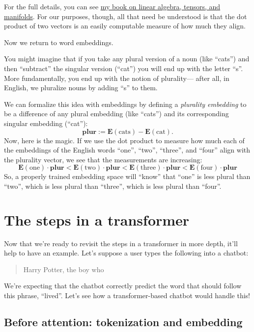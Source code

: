 \documentclass{article}
\begin{document}
For the full details, you can see \href{https://github.com/rossgk2/Linear-algebra-tensors-manifolds}{my book on linear algebra, tensors, and manifolds}. For our purposes, though, all that need be understood is that the dot product of two vectors is an easily computable measure of how much they align.

Now we return to word embeddings.

You might imagine that if you take any plural version of a noun (like ``cats'') and then ``subtract'' the singular version (``cat'') you will end up with the letter ``s''. More fundamentally, you end up with the notion of plurality--- after all, in English, we pluralize nouns by adding ``s'' to them.

We can formalize this idea with embeddings by defining a \textit{plurality embedding} to be a difference of any plural embedding (like ``cats'') and its corresponding singular embedding (``cat''):
$$
\textbf{plur} := \mathbf{E}(\text{cats}) - \mathbf{E}(\text{cat}).
$$
Now, here is the magic. If we use the dot product to measure how much each of the embeddings of the English words ``one'', ``two'', ``three'', and ``four'' align with the plurality vector, we see that the measurements are increasing:
$$
\mathbf{E}(\text{one}) \cdot \textbf{plur} < \mathbf{E}(\text{two}) \cdot \textbf{plur} < \mathbf{E}(\text{three}) \cdot \textbf{plur} < \mathbf{E}(\text{four}) \cdot \textbf{plur}
$$
So, a properly trained embedding space will ``know'' that ``one'' is less plural than ``two'', which is less plural than ``three'', which is less plural than ``four''.

\section*{The steps in a transformer}

Now that we're ready to revisit the steps in a transformer in more depth, it'll help to have an example. Let's suppose a user types the following into a chatbot:

\begin{quote}
Harry Potter, the boy who
\end{quote}

We're expecting that the chatbot correctly predict the word that should follow this phrase, ``lived''. Let's see how a transformer-based chatbot would handle this!

\subsection*{Before attention: tokenization and embedding}
\end{document}
